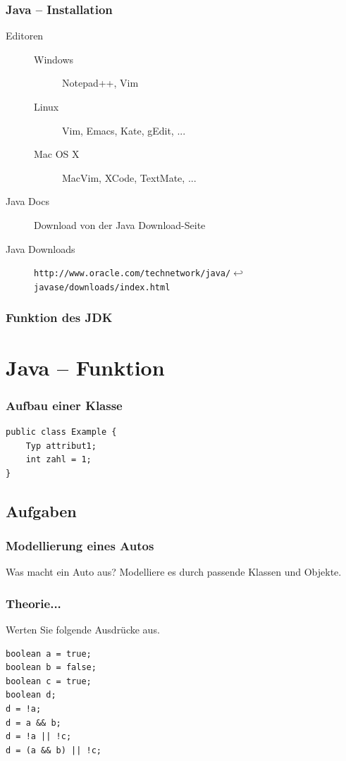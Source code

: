 \documentclass{beamer}
\begin{document}
\begin{frame}[fragile]
\frametitle{Java -- Installation}
\begin{description}
\item[Editoren]
\begin{description}
\item[Windows] Notepad++, Vim
\item[Linux] Vim, Emacs, Kate, gEdit, ...
\item[Mac OS X] MacVim, XCode, TextMate, ...
\end{description}
\item[Java Docs] Download von der Java Download-Seite
\item[Java Downloads] \verb|http://www.oracle.com/technetwork/java/|$\hookleftarrow$\\
\verb|javase/downloads/index.html|
\end{description}
\end{frame}

\begin{frame}
\frametitle{Funktion des JDK}
\end{frame}

\section{Java -- Funktion}
\begin{frame}[fragile]
\frametitle{Aufbau einer Klasse}
\begin{verbatim}
public class Example {
    Typ attribut1;
    int zahl = 1;
}
\end{verbatim}
\end{frame}

\subsection{Aufgaben}
\begin{frame}
\frametitle{Modellierung eines Autos}
Was macht ein Auto aus? Modelliere es durch passende Klassen und Objekte.
\end{frame}

\begin{frame}[fragile]
\frametitle{Theorie...}
Werten Sie folgende Ausdr\"{u}cke aus.
\begin{verbatim}
boolean a = true;
boolean b = false;
boolean c = true;
boolean d;
d = !a;
d = a && b;
d = !a || !c;
d = (a && b) || !c;
\end{verbatim}
\end{frame}
\end{document}
